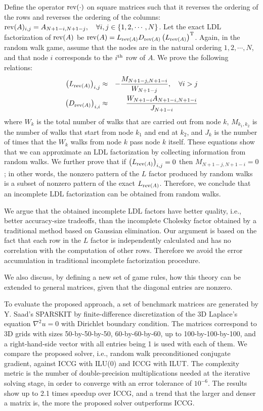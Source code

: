 \documentclass{report}
\begin{document}
Define the operator ${\rm rev}(\cdot)$ on square matrices such that
it reverses the ordering of the rows and reverses the ordering of the
columns: ${\rm rev}(A)_{i,j}=A_{N+1-i,N+1-j} , \quad \forall i,j \in \{ 1,2,\cdots,N \}$.
Let the exact LDL factorization of ${\rm rev}(A)$ be
${\rm rev}(A) = L_{{\rm rev}(A)} D_{{\rm rev}(A)} \left( L_{{\rm rev}(A)}
\right)^{\rm T}$.
Again, in the random walk game, assume that the nodes are in the natural ordering
$1,2,\cdots,N$, and that node $i$ corresponds to the $i^{\rm th}$ row of $A$.
We prove the following relations:
\begin{eqnarray}
\left( L_{{\rm rev}(A)} \right)_{i,j} & \approx & -
\frac{M_{N+1-j,N+1-i}}{W_{N+1-j}}, \quad\forall i>j
\\
\left( D_{{\rm rev}(A)} \right)_{i,i} & \approx & \frac{W_{N+1-i}
A_{N+1-i,N+1-i}} {J_{N+1-i}}
\end{eqnarray}
where
$W_k$ is the total number of walks that are carried out from node $k$,
$M_{k_1,k_2}$ is the number of walks that start from node $k_1$ and end at $k_2$,
and $J_{k}$ is the number of times that the $W_k$ walks from node $k$
pass node $k$ itself.
These equations show that we can approximate an LDL factorization by
collecting information
from random walks.
We further prove that if $\left( L_{{\rm rev}(A)} \right)_{i,j} = 0$ then
$M_{N+1-j,N+1-i} = 0$;
in other words, the nonzero pattern of the $L$ factor produced by random walks
is a subset of nonzero pattern of the exact $L_{{\rm rev}(A)}$.
Therefore, we conclude that an incomplete LDL factorization can be
obtained from random walks.

We argue that the obtained incomplete LDL factors have better quality, i.e.,
better accuracy-size tradeoffs, than the incomplete Cholesky factor obtained by
a traditional method based on Gaussian elimination. Our argument is based on the
fact that each row in the $L$ factor is independently calculated and has no
correlation with the computation of other rows. Therefore we avoid the error
accumulation in traditional incomplete factorization procedure.

We also discuss, by defining a new set of game rules, how this theory can be
extended to general matrices, given that the diagonal entries are nonzero.

To evaluate the proposed approach, a set of benchmark matrices are generated
by Y. Saad's SPARSKIT by finite-difference discretization of the 3D Laplace's
equation $\nabla ^2 u = 0$ with Dirichlet boundary condition. The matrices correspond
to 3D grids with sizes 50-by-50-by-50, 60-by-60-by-60, up to 100-by-100-by-100,
and a right-hand-side vector with all entries being 1 is used with each of them.
We compare the proposed solver, i.e., random walk preconditioned conjugate gradient,
against ICCG with ILU(0) and ICCG with ILUT. The complexity metric is the number
of double-precision multiplications needed at the iterative solving stage, in order
to converge with an error tolerance of $10^{-6}$. The results show up to 2.1 times
speedup over ICCG, and a trend that the larger and denser a matrix is, the more the
proposed solver outperforms ICCG.
\end{document}
